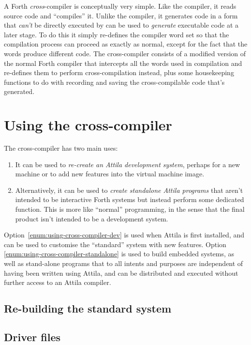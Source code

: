 A Forth \emph{cross}-compiler is conceptually very simple. Like the
compiler, it reads source code and ``compiles'' it. Unlike the
compiler, it generates code in a form that \emph{can't} be directly
executed by can be used to \emph{generate} executable code at a later
stage. To do this it simply re-defines the compiler word set so that
the compilation process can proceed as exactly as normal, except for
the fact that the words produce different code. The cross-compiler
consists of a modified version of the normal Forth compiler that
intercepts all the words used in compilation and re-defines them to
perform cross-compilation instead, plus some housekeeping functions to
do with recording and saving the cross-compilable code that's generated. 


\section{Using the cross-compiler}
\label{sec:using-cross-compiler}

The cross-compiler has two main uses:

\begin{enumerate}
\item\label{enum:using-cross-compiler-dev} It can be used to
  \emph{re-create an Attila development system}, perhaps for a new
  machine or to add new features into the virtual machine image.
\item\label{enum:using-cross-compiler-standalone} Alternatively, it
  can be used to \emph{create standalone Attila programs} that aren't
  intended to be interactive Forth systems but instead perform some
  dedicated function. This is more like ``normal'' programming, in the
  sense that the final product isn't intended to be a development
  system.
\end{enumerate}

Option~\ref{enum:using-cross-compiler-dev} is used when Attila is
first installed, and can be used to customise the ``standard'' system
with new features. Option \ref{enum:using-cross-compiler-standalone}
is used to build embedded systems, as well as stand-alone programs
that to all intents and purposes are independent of having been
written using Attila, and can be distributed and executed without
further access to an Attila compiler. 

\subsection{Re-building the standard system}
\label{sec:cross-compiler-rebuilding}



\subsection{Driver files}
\label{sec:cross-compiler-driver-file}


 


